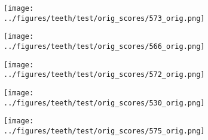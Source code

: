 \begin{figure}[h!]
	\begin{subfigure}{0.15\textwidth}
		\centering
		\texttt{[image: ../figures/teeth/test/orig\_scores/573\_orig.png]}
		\label{fig:1}
	\end{subfigure}
	\begin{subfigure}{0.15\textwidth}
		\centering
		\texttt{[image: ../figures/teeth/test/orig\_scores/566\_orig.png]}
		\label{fig:1}
	\end{subfigure}
	\begin{subfigure}{0.15\textwidth}
		\centering
		\texttt{[image: ../figures/teeth/test/orig\_scores/572\_orig.png]}
		\label{fig:1}
	\end{subfigure}
	\begin{subfigure}{0.15\textwidth}
		\centering
		\texttt{[image: ../figures/teeth/test/orig\_scores/530\_orig.png]}
		\label{fig:1}
	\end{subfigure}
	\begin{subfigure}{0.15\textwidth}
		\centering
		\texttt{[image: ../figures/teeth/test/orig\_scores/575\_orig.png]}
		\label{fig:1}
	\end{subfigure}
	\caption{}\label{fig:teethorig}
\end{figure}

